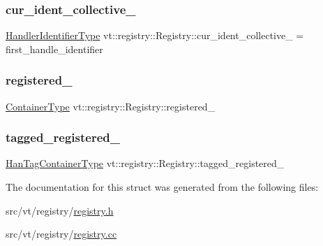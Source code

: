 \subsubsection{\texorpdfstring{cur\+\_\+ident\+\_\+collective\+\_\+}{cur\_ident\_collective\_}}
{\footnotesize\ttfamily \hyperlink{namespacevt_a59ae068fe828d1c33051ff96f3d016b6}{Handler\+Identifier\+Type} vt\+::registry\+::\+Registry\+::cur\+\_\+ident\+\_\+collective\+\_\+ = first\+\_\+handle\+\_\+identifier\hspace{0.3cm}{\ttfamily [private]}}

\mbox{\label{structvt_1_1registry_1_1_registry_adb3e36c663839801759d6bd264b8c4b5}} 
\subsubsection{\texorpdfstring{registered\+\_\+}{registered\_}}
{\footnotesize\ttfamily \hyperlink{structvt_1_1registry_1_1_registry_ac9e1297d26b6c553ccdaa46858cdb3b8}{Container\+Type} vt\+::registry\+::\+Registry\+::registered\+\_\+\hspace{0.3cm}{\ttfamily [private]}}

\mbox{\label{structvt_1_1registry_1_1_registry_ad7d3a1810876242414c29c24db82bb6c}} 
\subsubsection{\texorpdfstring{tagged\+\_\+registered\+\_\+}{tagged\_registered\_}}
{\footnotesize\ttfamily \hyperlink{structvt_1_1registry_1_1_registry_ab5d336044aee749d39c8feabe4fa6983}{Han\+Tag\+Container\+Type} vt\+::registry\+::\+Registry\+::tagged\+\_\+registered\+\_\+\hspace{0.3cm}{\ttfamily [private]}}



The documentation for this struct was generated from the following files\+:\begin{DoxyCompactItemize}
\item 
src/vt/registry/\hyperlink{registry_2registry_8h}{registry.\+h}\item 
src/vt/registry/\hyperlink{registry_8cc}{registry.\+cc}\end{DoxyCompactItemize}
